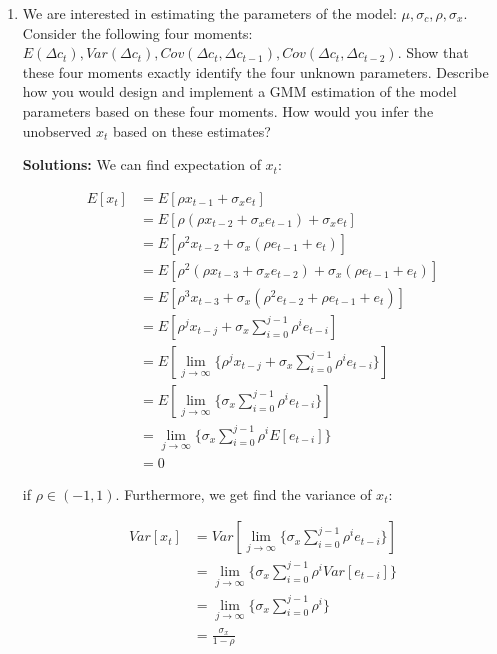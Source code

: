 \documentclass{article}
\begin{document}
\begin{enumerate}

\item We are interested in estimating the parameters of the model: $\mu, \sigma_c, \rho, \sigma_x$. Consider the following four moments: $E(\Delta c_t), Var(\Delta c_t), Cov(\Delta c_t, \Delta c_{t-1}), Cov(\Delta c_t, \Delta c_{t-2})$. Show that these four moments exactly identify the four unknown parameters. Describe how you would design and implement a GMM estimation of the model parameters based on these four moments. How would you infer the unobserved $x_t$ based on these estimates?

\bigskip

\textbf{Solutions:} We can find expectation of $x_t$:

\begin{align*}
E[x_{t}]
&= E[\rho x_{t-1} + \sigma_x e_{t}] \\
&= E[\rho (\rho x_{t-2} + \sigma_x e_{t-1}) + \sigma_x e_{t}] \\
&= E[\rho^2x_{t-2} + \sigma_x (\rho e_{t-1} + e_t)]\\
&= E[\rho^2(\rho x_{t-3} + \sigma_x e_{t-2}) + \sigma_x (\rho e_{t-1} + e_t)]\\
&= E[\rho^3 x_{t-3} + \sigma_x (\rho^2 e_{t-2} + \rho e_{t-1} + e_t)]\\
&= E[\rho^j x_{t-j} + \sigma_x \sum_{i=0}^{j-1} \rho^i e_{t-i}]\\
&= E[\lim_{j\to\infty} \{\rho^j x_{t-j} + \sigma_x \sum_{i=0}^{j-1} \rho^i e_{t-i}\}]\\
&= E[\lim_{j\to\infty} \{\sigma_x \sum_{i=0}^{j-1} \rho^i e_{t-i}\}]\\
&= \lim_{j\to\infty} \{\sigma_x \sum_{i=0}^{j-1} \rho^i E[e_{t-i}]\}\\
&= 0
\end{align*}

if $\rho \in (-1, 1)$.  Furthermore, we get find the variance of $x_t$:


\begin{align*}
Var[x_{t}]
&= Var[\lim_{j\to\infty} \{\sigma_x \sum_{i=0}^{j-1} \rho^i e_{t-i}\}]\\
&= \lim_{j\to\infty} \{\sigma_x \sum_{i=0}^{j-1} \rho^i Var[e_{t-i}]\}\\
&= \lim_{j\to\infty} \{\sigma_x \sum_{i=0}^{j-1} \rho^i\} \\
&= \frac{\sigma_x}{1-\rho}
\end{align*}

\pagebreak


\end{enumerate}
\end{document}
